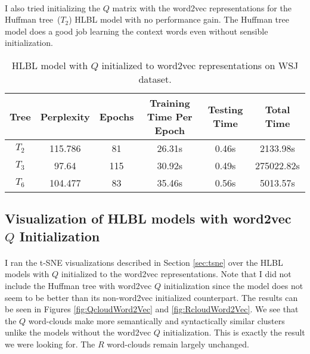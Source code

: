 \paragraph{}
I also tried initializing the $Q$ matrix with the word2vec representations for the Huffman tree~($T_2$) HLBL model with no performance gain. The Huffman tree model does a good job learning the context words even without sensible initialization. 

\begin{table*} \centering
{}
\begin{tabular}{cccccc}\toprule
Tree & Perplexity & Epochs & Training Time Per Epoch & Testing Time & Total Time\\ 
\midrule
$T_2$ & 115.786 & 81 & 26.31s &0.46s & 2133.98s \\
$T_3$ & 97.64 & 115& 30.92s & 0.49s& 275022.82s\\
$T_6$& 104.477 & 83& 35.46s & 0.56s& 5013.57s\\
\bottomrule
\end{tabular}
\caption{HLBL model with $Q$ initialized to word2vec representations on WSJ dataset.}
\label{tab:brownWord2vec}
\end{table*}

\subsection{Visualization of HLBL models with word2vec $Q$ Initialization}
\paragraph{}
I ran the t-SNE visualizations described in Section \ref{sec:tsne} over the HLBL models with $Q$ initialized to the word2vec representations. Note that I did not include the Huffman tree with word2vec $Q$ initialization since the model does not seem to be better than its non-word2vec initialized counterpart. The results can be seen in Figures \ref{fig:QcloudWord2Vec} and \ref{fig:RcloudWord2Vec}. We see that the $Q$ word-clouds make more semantically and syntactically similar clusters unlike the models without the word2vec $Q$ initialization. This is exactly the result we were looking for. The $R$ word-clouds remain largely unchanged. 

